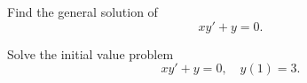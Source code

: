 \begin{example}
  \label{example:2.1.4}\rm

  \begin{alist}
    \item %
    Find the general solution of
    \begin{equation}
      xy'+y=0.\label{eq:2.1.8}
    \end{equation}

    \item %
    Solve the initial value problem
    \begin{equation}
      xy'+y=0,\quad y(1)=3.\label{eq:2.1.9}
    \end{equation}
  \end{alist}
\end{example}

